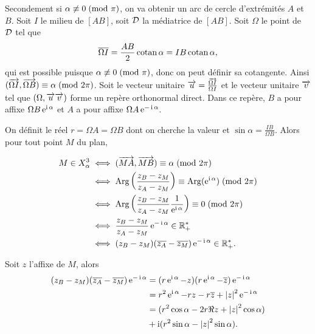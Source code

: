 Secondement si  \(\alpha \not\equiv 0\!\pmod {\pi}\), on va obtenir un arc de cercle 
d'extrémités \(A\) et \(B\). Soit \(I\) le milieu de \([AB]\), soit \(\mathcal{D}\) la 
médiatrice de \([AB]\). Soit \(\Omega\) le point de \(\mathcal{D}\) tel que
\begin{equation}
    \overline{\Omega I} = \frac{AB}{2}\operatorname{cotan} \alpha = IB \operatorname{cotan} \alpha,
\end{equation}
qui est possible puisque \(\alpha \not\equiv 0\!\pmod {\pi}\), donc on peut définir sa 
cotangente. Ainsi \((\overrightarrow{\Omega I},\overrightarrow{\Omega B}) \equiv \alpha\!\pmod {2\pi}\). 
Soit le vecteur unitaire \(\overrightarrow{u} = \frac{\overrightarrow{\Omega I}}{\Omega I}\) et le 
vecteur unitaire \(\overrightarrow{v}\) tel que \((\Omega, \overrightarrow{u} \overrightarrow{v})\) forme un repère 
orthonormal direct. Dans ce repère, \(B\) a pour affixe \(\Omega B \operatorname{e}^{\operatorname{i} 
\alpha}\) et \(A\) a pour affixe \(\Omega A \operatorname{e}^{-\operatorname{i} \alpha}\).

On définit le réel \(r = \Omega A = \Omega B\) dont on cherche la valeur et 
\(\sin \alpha = \frac{IB}{\Omega B}\). Alors pour tout point \(M\) du plan,

\begin{align}
    M \in X_{\alpha}^3 & \iff (\overrightarrow{MA},\overrightarrow{MB}) \equiv \alpha\!\pmod {2\pi} \\
                       & \iff \operatorname{Arg}\left(\frac{z_B - z_M}{z_A - 
                       z_M}\right) \equiv \operatorname{Arg}(\operatorname{e}^{\operatorname{i} \alpha})\!\pmod {2\pi}\\
                       & \iff \operatorname{Arg}\left(\frac{z_B - z_M}{z_A - z_M} 
                       \frac{1}{\operatorname{e}^{\operatorname{i} \alpha}}\right) \equiv 0\!\pmod {2\pi}\\
                       & \iff \frac{z_B - z_M}{z_A - z_M} \operatorname{e}^{-\operatorname{i} \alpha} \in 
                       \mathbb{R}_{+}^{*}\\
                       & \iff (z_B - z_M)(\overline{z_A}-\overline{z_M})\operatorname{e}^{-\operatorname{i} \alpha} 
                       \in \mathbb{R}_{+}^{*}.
\end{align}

Soit \(z\) l'affixe de \(M\), alors
\begin{align}
    (z_B - z_M)(\overline{z_A}-\overline{z_M})\operatorname{e}^{-\operatorname{i} \alpha} & = (r\operatorname{e}^{\operatorname{i} \alpha} - 
    z)(r\operatorname{e}^{\operatorname{i} \alpha} - \overline{z})\operatorname{e}^{-\operatorname{i} \alpha} \\
                                                     & = r^2 \operatorname{e}^{\operatorname{i} \alpha} - 
                                                     rz - r\overline{z} + 
                                                     \left\lvert z\right\rvert^2\operatorname{e}^{-\operatorname{i} \alpha} 
                                                     \\
                                                     & = (r^2\cos \alpha - 
    2r\Re{z} + \left\lvert z\right\rvert^2\cos \alpha) \\ &+ \operatorname{i}(r^2\sin \alpha - \left\lvert z\right\rvert^2\sin 
    \alpha).
\end{align}

